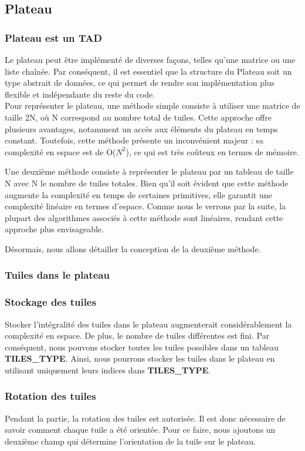 \documentclass[10pt]{article}
\begin{document}
\subsection{Plateau}
\subsubsection{Plateau est un TAD }
Le plateau peut être implémenté de diverses façons, telles qu'une matrice ou une liste chaînée. Par conséquent, il est essentiel que la structure du Plateau soit un type abstrait de données, ce qui permet de rendre son implémentation plus flexible et indépendante du reste du code. \\
Pour représenter le plateau, une méthode simple consiste à utiliser une matrice de taille 2N, où N correspond au nombre total de tuiles. Cette approche offre plusieurs avantages, notamment un accès aux éléments du plateau en temps constant. Toutefois, cette méthode présente un inconvénient majeur : sa complexité en espace est de O($N^2$), ce qui est très coûteux en termes de mémoire.

Une deuxième méthode consiste à représenter le plateau par un tableau de taille N avec N le nombre de tuiles totales. Bien qu'il soit évident que cette méthode augmente la complexité en temps de certaines primitives, elle garantit une complexité linéaire en termes d'espace. Comme nous le verrons par la suite, la plupart des algorithmes associés à cette méthode sont linéaires, rendant cette approche plus envisageable.

Désormais, nous allons détailler la conception de la deuxième méthode.
\subsubsection{Tuiles dans le plateau}
\subsubsection*{Stockage des tuiles}
Stocker l'intégralité des tuiles dans le plateau augmenterait considérablement la complexité en espace. De plus, le nombre de tuiles différentes est fini. Par conséquent, nous pouvons stocker toutes les tuiles possibles dans un tableau \textbf{TILES\_TYPE}. Ainsi, nous pourrons stocker les tuiles dans le plateau en utilisant uniquement leurs indices dans \textbf{TILES\_TYPE}.
\subsubsection*{Rotation des tuiles}
Pendant la partie, la rotation des tuiles est autorisée. Il est donc nécessaire de savoir comment chaque tuile a été orientée. Pour ce faire, nous ajoutons un deuxième champ qui détermine l'orientation de la tuile sur le plateau.
\end{document}
